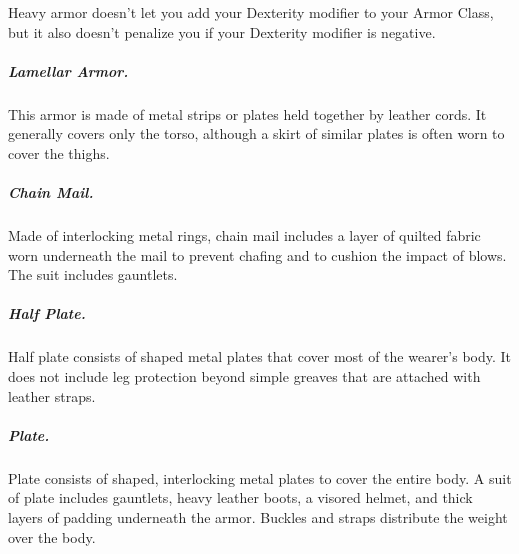 Heavy armor doesn't let you add your Dexterity modifier to your Armor Class, but it also doesn't penalize you if your Dexterity modifier is negative.

\subparagraph*{Lamellar Armor.} This armor is made of metal strips or plates held together by leather cords. It generally covers only the torso, although a skirt of similar plates is often worn to cover the thighs.

\subparagraph*{Chain Mail.} Made of interlocking metal rings, chain mail includes a layer of quilted fabric worn underneath the mail to prevent chafing and to cushion the impact of blows. The suit includes gauntlets.

\subparagraph*{Half Plate.} Half plate consists of shaped metal plates that cover most of the wearer's body. It does not include leg protection beyond simple greaves that are attached with leather straps.

\subparagraph*{Plate.} Plate consists of shaped, interlocking metal plates to cover the entire body. A suit of plate includes gauntlets, heavy leather boots, a visored helmet, and thick layers of padding underneath the armor. Buckles and straps distribute the weight over the body.

